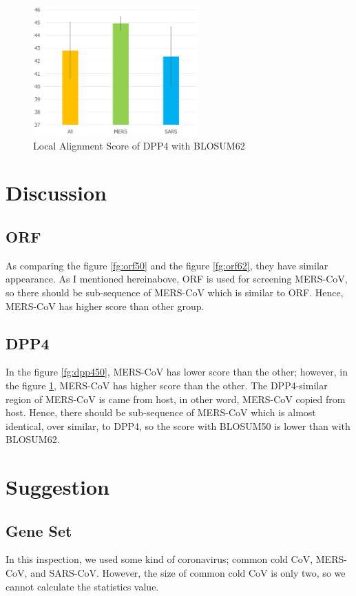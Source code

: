 \documentclass[aps,10pt,a4paper]{article}
\begin{document}
			\begin{figure}[htbp]
				\centering
				\includegraphics[height=5cm]{DPP462}
				\caption{Local Alignment Score of DPP4 with BLOSUM62}
				\label{fg:dpp462}
			\end{figure}
	
	\section{Discussion}
		\subsection{ORF}
			As comparing the figure \ref{fg:orf50} and the figure \ref{fg:orf62}, they have similar appearance. As I mentioned hereinabove, ORF is used for screening MERS-CoV, so there should be sub-sequence of MERS-CoV which is similar to ORF. Hence, MERS-CoV has higher score than other group.
		
		\subsection{DPP4}
			In the figure \ref{fg:dpp450}, MERS-CoV has lower score than the other; however, in the figure \ref{fg:dpp462}, MERS-CoV has higher score than the other. The DPP4-similar region of MERS-CoV is came from host, in other word, MERS-CoV copied from host. Hence, there should be sub-sequence of MERS-CoV which is almost identical, over similar, to DPP4, so the score with BLOSUM50 is lower than with BLOSUM62.
		
	\section{Suggestion}
		\subsection{Gene Set}
			In this inspection, we used some kind of coronavirus; common cold CoV, MERS-CoV, and SARS-CoV. However, the size of common cold CoV is only two, so we cannot calculate the statistics value. 
		
\end{document}
